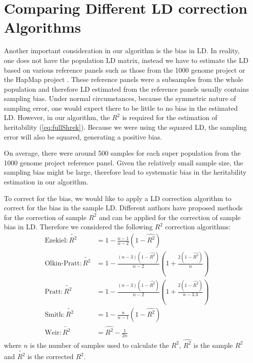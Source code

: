\documentclass[12pt]{scrbook}
\begin{document}
\section{Comparing Different LD correction Algorithms}
\label{sec:ldSim}
Another important consideration in our algorithm is the bias in \gls{LD}.
In reality, one does not have the population \gls{LD} matrix, instead we have to estimate the \gls{LD} based on various reference panels such as those from the 1000 genome project \citep{Project2012} or the HapMap project \citep{Altshuler2010}.
These reference panels were a subsamples from the whole population and therefore \gls{LD} estimated from the reference panels usually contains sampling bias.
Under normal circumstances, because the symmetric nature of sampling error, one would expect there to be little to no bias in the estimated \gls{LD}.
However, in our algorithm, the $R^2$ is required for the estimation of heritability (\cref{eq:fullShrek}).
Because we were using the squared \gls{LD}, the sampling error will also be squared, generating a positive bias. 

On average, there were around 500 samples for each super population from the 1000 genome project reference panel.
Given the relatively small sample size, the sampling bias might be large, therefore lead to systematic bias in the heritability estimation in our algorithm.

To correct for the bias, we would like to apply a \gls{LD} correction algorithm to correct for the bias in the sample \gls{LD}.
Different authors \citep{Weir1980,Wang2007} have proposed methods for the correction of sample $R^2$ and can be applied for the correction of sample bias in \gls{LD}.
Therefore we considered the following $R^2$ correction algorithms:
\begin{align}
\text{Ezekiel}: \tilde{R^2}&= 1-\frac{n-1}{n-2}(1-\hat{R^2})\label{eq:ezekiel} \\
\text{Olkin-Pratt}: \tilde{R^2}&=1-\frac{(n-3)(1-\hat{R^2})}{n-2}(1+\frac{2(1-\hat{R^2})}{n})\label{eq:okin} \\
\text{Pratt}: \tilde{R^2}&=1-\frac{(n-3)(1-\hat{R^2})}{n-2}(1+\frac{2(1-\hat{R^2})}{n-3.3})\label{eq:pratt} \\
\text{Smith}: \tilde{R^2}&=1-\frac{n}{n-1}(1-\hat{R^2}) \label{eq:smith}\\
\text{Weir}: \tilde{R^2}&=\hat{R^2}-\frac{1}{2n} \label{eq:weir}
\end{align}
where $n$ is the number of samples used to calculate the $R^2$, $\hat{R^2}$ is the sample $R^2$ and $\tilde{R^2}$ is the corrected $R^2$.
\end{document}

